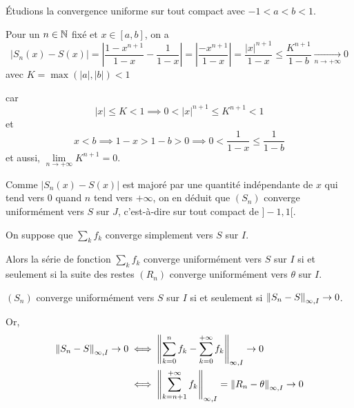 \documentclass[a4paper, 12pt]{article}
\begin{document}
\begin{exemple}
    Étudions la convergence uniforme sur tout compact \text{$J := [a, b] \subset ]-1, 1[$} avec $-1 < a < b < 1$.

    Pour un $n \in \mathbb{N}$ fixé et $x \in [a, b]$, on a
    $$
    |S_n(x) - S(x)| = \left|\dfrac{1-x^{n+1}}{1-x} - \dfrac{1}{1-x}\right| = \left|\dfrac{-x^{n+1}}{1-x}\right| = \dfrac{|x|^{n+1}}{1 - x} \leq \dfrac{K^{n+1}}{1 - b} \underset{n \to +\infty}{\to} 0
    $$
    avec $K = \max(|a|, |b|) < 1$

    car
    $$
    |x| \leq K < 1 \implies 0 < |x|^{n+1} \leq K^{n+1} < 1
    $$
    et
    $$
    x < b \implies 1 - x > 1 - b > 0 \implies 0 < \dfrac{1}{1 - x} \leq \dfrac{1}{1 - b}
    $$
    et aussi, $\lim\limits_{n \to +\infty} K^{n+1} = 0$.

    Comme $|S_n(x) - S(x)|$ est majoré par une quantité indépendante de $x$ qui tend vers $0$ quand $n$ tend vers $+\infty$, on en déduit que
    $(S_n)$ converge uniformément vers $S$ sur $J$, c'est-à-dire sur tout compact de $]-1, 1[$.
\end{exemple}

\begin{proposition}{}{}
    On suppose que $\sum\limits_k f_k$ converge simplement vers $S$ sur $I$.

    Alors la série de fonction $\sum\limits_k f_k$ converge uniformément vers $S$ sur $I$ si et seulement si
    la suite des restes $(R_n)$ converge uniformément vers $\theta$ sur $I$.
\end{proposition}

\begin{demonstration}
    $(S_n)$ converge uniformément vers $S$ sur $I$ si et seulement si $\left\lVert S_n - S\right\rVert_{\infty, I} \to 0$.

    Or,
    \begin{align*}
        \left\lVert S_n - S\right\rVert_{\infty, I} \to 0 &\iff \left\lVert\sum_{k=0}^n f_k - \sum_{k=0}^{+\infty} f_k\right\rVert_{\infty, I} \to 0 \\
        &\iff \left\lVert\sum_{k=n+1}^{+\infty} f_k\right\rVert_{\infty, I} = \left\lVert R_n - \theta\right\rVert_{\infty, I} \to 0
    \end{align*}
\end{demonstration}
\end{document}
